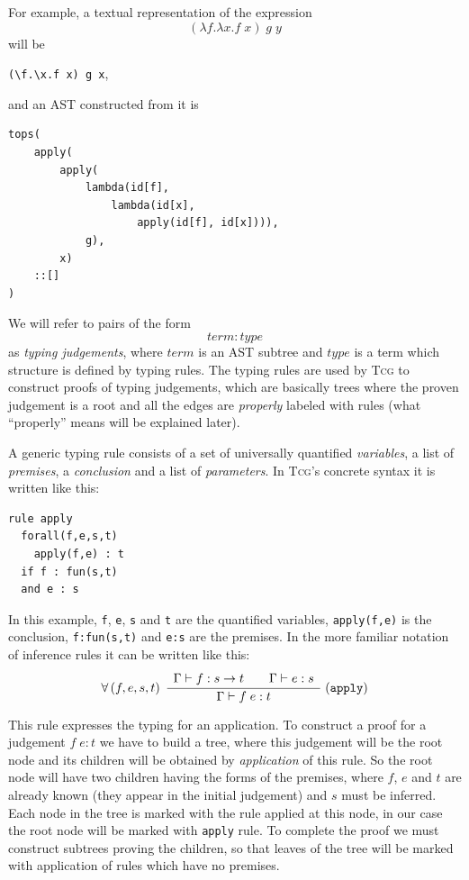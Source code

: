 \documentclass[a4paper,12pt]{article}
\newcommand{\Tcg}{\textsc{Tcg}}
\newcommand{\code}[1]{\texttt{#1}}
\newcounter{premise}
\newcommand{\ifnotempty}[2]{\ifthenelse{\equal{#1}{}}{}{#2}}
\newcommand{\tcgrule}[5]{%
	\setcounter{premise}{0}%
$$%
    \ifnotempty{#1}{%
        \forall \left(#1\right)\;%
    }%
    \dfrac{%
	    \begin{array}[b]{l}%
	    #2%
            \end{array}%
    }{%
            #3%
    }%
    \;\ifnotempty{#4}{(\mathtt{#4}\ifnotempty{#5}{[\mathbf{#5}]})}%
$$%
}
\begin{document}
For example, a textual representation of the expression 
$$(\lambda f.\lambda x. f\; x)\; g\; y$$
will be 
\begin{center}
\code{(\textbackslash f.\textbackslash x.f x) g x},
\end{center}
and an AST constructed from it is%
\begin{verbatim}
tops(
    apply(
        apply(
            lambda(id[f], 
                lambda(id[x], 
                    apply(id[f], id[x]))),
            g),
        x)
    ::[]
)
\end{verbatim}

We will refer to pairs of the form
$$term : type$$
as \emph{typing judgements}, where $term$ is an AST subtree and $type$ is a term which structure is defined by typing rules. The typing rules are used by \Tcg{} to construct proofs of typing judgements, which are basically trees where the proven judgement is a root and all the edges are \emph{properly} labeled with rules (what ``properly'' means will be explained later). 

A generic typing rule consists of a set of universally quantified \emph{variables}, a list of \emph{premises}, a \emph{conclusion} and a list of \emph{parameters}. In \Tcg{}'s concrete syntax it is written like this:
\begin{verbatim}
rule apply
  forall(f,e,s,t)
    apply(f,e) : t
  if f : fun(s,t)
  and e : s
\end{verbatim}

In this example, \code{f}, \code{e}, \code{s} and \code{t} are the quantified variables, \code{apply(f,e)} is the conclusion, \code{f:fun(s,t)} and \code{e:s} are the premises. In the more familiar notation of inference rules it can be written like this:
\tcgrule{f, e, s, t}{
    \Gamma \vdash f : s \rightarrow t
    \hspace{20pt}
    \Gamma \vdash e : s
}{\Gamma \vdash f\; e : t}{apply}{}

This rule expresses the typing for an application. To construct a proof for a judgement $f\;e : t$ we have to build a tree, where this judgement will be the root node and its children will be obtained by \emph{application} of this rule. So the root node will have two children having the forms of the premises, where $f$, $e$ and $t$ are already known (they appear in the initial judgement) and $s$ must be inferred. Each node in the tree is marked with the rule applied at this node, in our case the root node will be marked with \code{apply} rule. To complete the proof we must construct subtrees proving the children, so that leaves of the tree will be marked with application of rules which have no premises. 
\end{document}
